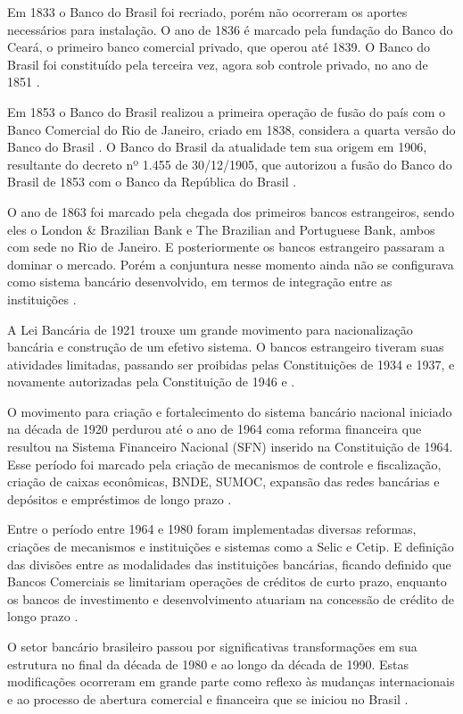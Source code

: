 \documentclass[12pt,12pt,openright,oneside,a4paper,chapter=TITLE,section=TITLE,subsection=TITLE,subsubsection=TITLE,english,french,spanish,portugues,sumario=tradicional]{abntex2}
\begin{document}
Em 1833 o Banco do Brasil foi recriado, porém não ocorreram os aportes necessários para instalação. O ano de 1836 é marcado pela fundação do Banco do Ceará, o primeiro banco comercial privado, que operou até 1839. O Banco do Brasil foi constituído pela terceira vez, agora sob controle privado, no ano de 1851 \cite{camargo:2009}.

Em 1853 o Banco do Brasil realizou a primeira operação de fusão do país com o Banco Comercial do Rio de Janeiro, criado em 1838, considera a quarta versão do Banco do Brasil \cite{camargo:2009}. O Banco do Brasil da atualidade tem sua origem em 1906, resultante do decreto nº 1.455 de 30/12/1905, que autorizou a fusão do Banco do Brasil de 1853 com o Banco da República do Brasil \cite{camargo:2009} \cite{Lei:1455:1905}.

O ano de 1863 foi marcado pela chegada dos primeiros bancos estrangeiros, sendo eles o London \& Brazilian Bank e The Brazilian and Portuguese Bank, ambos com sede no Rio de Janeiro. E posteriormente os bancos estrangeiro passaram a dominar o mercado. Porém a conjuntura nesse momento ainda não se configurava como sistema bancário desenvolvido, em termos de integração entre as instituições \cite{camargo:2009}.

A Lei Bancária de 1921 trouxe um grande movimento para nacionalização bancária e construção de um efetivo sistema. O bancos estrangeiro tiveram suas atividades limitadas, passando ser proibidas pelas Constituições de 1934 e 1937, e novamente autorizadas pela Constituição de 1946 e \cite{camargo:2009}.

O movimento para criação e fortalecimento do sistema bancário nacional iniciado na década de 1920 perdurou até o ano de 1964 coma reforma financeira que resultou na Sistema Financeiro Nacional (SFN) inserido na Constituição de 1964. Esse período foi marcado pela criação de mecanismos de controle e fiscalização, criação de caixas econômicas, BNDE, SUMOC, expansão das redes bancárias e depósitos e empréstimos de longo prazo \cite{camargo:2009}.

Entre o período entre 1964 e 1980 foram implementadas diversas reformas, criações de mecanismos e instituições e sistemas como a Selic e Cetip. E definição das divisões entre as modalidades das instituições bancárias, ficando definido que Bancos Comerciais se limitariam operações de créditos de curto prazo, enquanto os bancos de investimento e desenvolvimento atuariam na concessão de crédito de longo prazo \cite{camargo:2009}.

O setor bancário brasileiro passou por significativas transformações em sua
estrutura no final da década de 1980 e ao longo da década de 1990. Estas
modificações ocorreram em grande parte como reflexo às mudanças internacionais
e ao processo de abertura comercial e financeira que se iniciou no Brasil
\cite{camargo:2009}.
\end{document}
